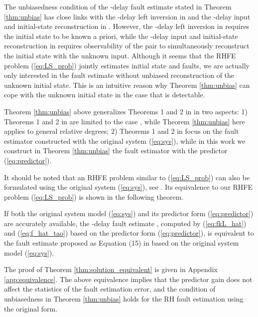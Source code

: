 \documentclass[twocolumn]{autart}
\begin{document}
\begin{rem}
The unbiasedness condition of the -delay fault estimate stated in Theorem \ref{thm:unbias} has close links with the -delay left inversion in \cite{Massey1968, Gill2007} and the -delay input and initial-state reconstruction in \cite{Kirt2011}. However, the -delay left inversion in \cite{Massey1968, Gill2007} requires the initial state to be known a priori, while the -delay input and initial-state reconstruction in \cite{Kirt2011} requires observability of the pair  to simultaneously reconstruct the initial state with the unknown input. Although it seems that the RHFE problem (\ref{eq:LS_prob}) jointly estimates initial state and faults, we are actually only interested in the fault estimate without unbiased reconstruction of the unknown initial state. This is an intuitive reason why Theorem \ref{thm:unbias} can cope with the unknown initial state in the case that  is detectable.
\end{rem}

\begin{rem}
Theorem \ref{thm:unbias} above generalizes Theorems 1 and 2 in \cite{Wan2014} in two aspects: 1) Theorems 1 and 2 in \cite{Wan2014} are limited to the case , while Theorem \ref{thm:unbias} here applies to general relative degrees; 2) Theorems 1 and 2 in \cite{Wan2014} focus on the fault estimator constructed with the original system (\ref{eq:sys}), while in this work we construct in Theorem \ref{thm:unbias} the fault estimator with the predictor (\ref{eq:predictor}).
\end{rem}


It should be noted that an RHFE problem similar to (\ref{eq:LS_prob}) can also be formulated using the original system (\ref{eq:sys}), see \cite{Wan2014}. Its equivalence to our RHFE problem (\ref{eq:LS_prob}) is shown in the following theorem.


\begin{thm}\label{thm:solution_equivalent}
If both the original system model (\ref{eq:sys}) and its predictor form (\ref{eq:predictor}) are accurately available, the -delay fault estimate , computed by (\ref{eq:fkL_hat}) and (\ref{eq:f_hat_tao}) based on the predictor form (\ref{eq:predictor}), is equivalent to the fault estimate proposed as Equation (15) in \cite{Wan2014} based on the original system model (\ref{eq:sys}).
\end{thm}

The proof of Theorem \ref{thm:solution_equivalent} is given in Appendix \ref{app:equivalence}. 
The above equivalence implies that the predictor gain  does not affect the statistics of the fault estimation error, and the condition of unbiasedness in Theorem \ref{thm:unbias} holds for the RH fault estimation using the original form.
\end{document}
